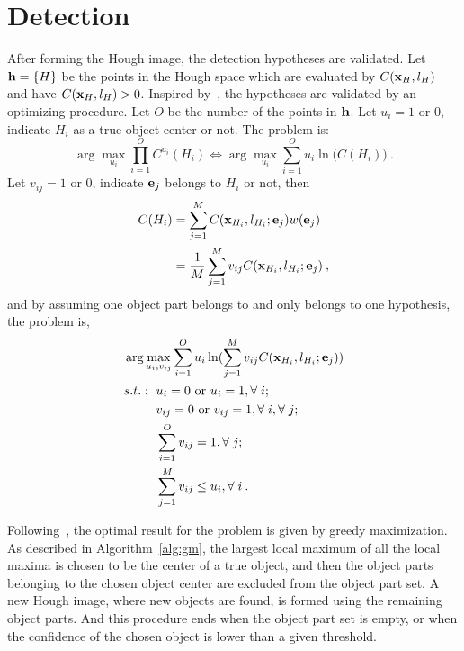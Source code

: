 \documentclass{mva2011}
\begin{document}
\section{Detection}
After forming the Hough image, the detection hypotheses are validated. Let ${\bf{h}}=\{ H \}$ be the points in the Hough space which are evaluated by $C({\bf{x}}_{H},l_{H})$ and have $C({\bf{x}}_{H},l_{H})>0$.  Inspired by~\cite{ac9}, the hypotheses are validated by an optimizing procedure. Let $O$ be the number of the points in ${\bf{h}}$.  Let $u_i=1\mbox{ or } 0$, indicate $H_i$ as a true object center or not. The problem is:
\[
\arg \max\limits_{u_i} \prod\limits_{i = 1}^O { C^{u_i}({H_i})} \Longleftrightarrow\arg \max\limits_{u_i} \sum\limits_{i = 1}^O {{u_i}\ln (C({H_i})} )\:.
\]
Let $v_{ij}=1\mbox{ or } 0$, indicate  ${\bf{e}}_j$ belongs to $H_i$ or not, then
\[
\begin{aligned}
C(H_i)&=\sum\limits^M_{j=1} C({\bf{x}}_{H_i},l_{H_i};{\bf{e}}_j)w({\bf{e}}_j)\\
&=\frac 1 M \sum\limits^M_{j=1} v_{ij} C({\bf{x}}_{H_i},l_{H_i};{\bf{e}}_j)\:,
\end{aligned}
\]
and by assuming one object part belongs to and only belongs to one hypothesis, the problem is,
\[
\begin{aligned}
&\arg \max\limits_{u_i,v_{ij}} \sum\limits_{i = 1}^O {{u_i}\ln (\sum\limits^M_{j=1} v_{ij} C({\bf{x}}_{H_i},l_{H_i};{\bf{e}}_j)} )\\
&
\begin{aligned}
    s.t.:\mbox{ }&u_i=0\mbox{ or }u_i=1,\forall\;i;\\
    &v_{ij}=0\mbox{ or }v_{ij}=1,\forall\;i,\forall\;j;\\
    &\sum\limits_{i = 1}^O {v_{ij}}=1,\forall\;j;\;\;  \\
    &\sum\limits_{j = 1}^M {v_{ij}}\leq u_i,\forall\;i\:.
\end{aligned}
\end{aligned}
\]


Following~\cite{ac9}, the optimal result for the problem is given by greedy maximization. As described in Algorithm~\ref{alg:gm}, the largest local maximum of all the local maxima is chosen to be the center of a true object, and then the object parts belonging to the chosen object center are excluded from the object part set. A new Hough image, where new objects are found, is formed using the remaining object parts. And this procedure ends when the object part set is empty, or when the confidence of the chosen object is lower than a given threshold.
\end{document}
